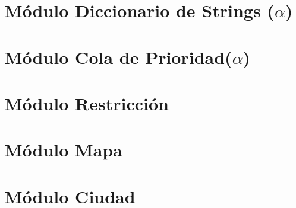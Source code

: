 \documentclass[a4paper,titlepage]{article}
\begin{document}
\section{Módulo Diccionario de Strings ($\alpha$)}



\section{Módulo Cola de Prioridad($\alpha$)}



\section{Módulo Restricción}



\section{Módulo Mapa}



\section{Módulo Ciudad}


\end{document}
